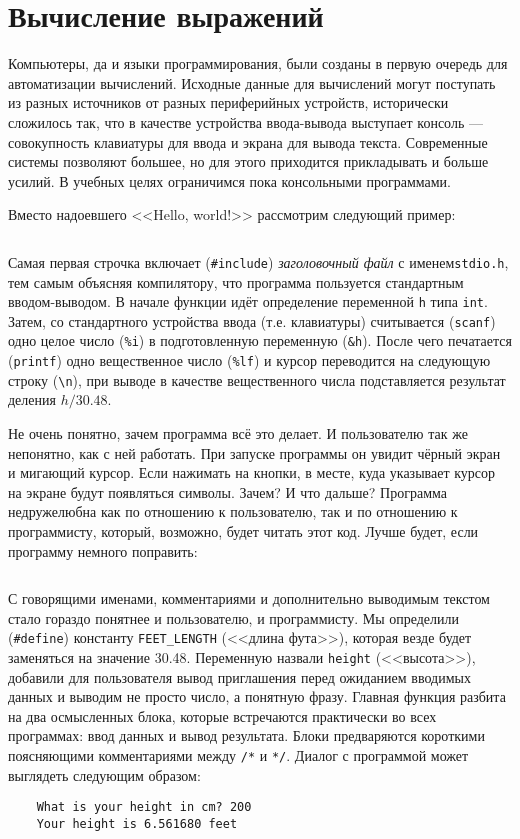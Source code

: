 \section{Вычисление выражений}

Компьютеры, да и языки программирования, были созданы в первую очередь для
автоматизации вычислений. Исходные данные для вычислений могут поступать из
разных источников от разных периферийных устройств, исторически сложилось так,
что в качестве устройства ввода-вывода выступает консоль --- совокупность
клавиатуры для ввода и экрана для вывода текста. Современные системы позволяют
большее, но для этого приходится прикладывать и больше усилий. В учебных целях
ограничимся пока консольными программами.

\zzneedspace
Вместо надоевшего <<Hello, world!>> рассмотрим следующий пример:
%
\inputminted{c}{samples/feet_bad.c}

Самая первая строчка включает (\verb|#include|) \textit{заголовочный файл} с
именем\linebreak \texttt{stdio.h}, тем самым объясняя компилятору, что программа
пользуется стандартным вводом-выводом. В начале функции идёт определение
переменной \texttt{h} типа \texttt{int}. Затем, со стандартного устройства
ввода (т.е. клавиатуры) считывается (\texttt{scanf}) одно целое число
(\texttt{\%i}) в подготовленную переменную (\verb|&h|). После чего печатается
(\texttt{printf}) одно вещественное число (\texttt{\%lf}) и курсор переводится
на следующую строку (\verb|\n|), при выводе в качестве вещественного числа
подставляется результат деления $h / 30.48$.

Не очень понятно, зачем программа всё это делает. И пользователю так же
непонятно, как с ней работать. При запуске программы он увидит чёрный экран и
мигающий курсор. Если нажимать на кнопки, в месте, куда указывает курсор на
экране будут появляться символы. Зачем? И что дальше? Программа недружелюбна
как по отношению к пользователю, так и по отношению к программисту, который,
возможно, будет читать этот код. Лучше будет, если программу немного
поправить:
%
\inputminted{c}{samples/feet.c}

С говорящими именами, комментариями и дополнительно выводимым текстом стало
гораздо понятнее и пользователю, и программисту. Мы определили
(\verb|#define|) константу \verb|FEET_LENGTH| (<<длина фута>>), которая везде
будет заменяться на значение 30.48. Переменную назвали \texttt{height}
(<<высота>>), добавили для пользователя вывод приглашения перед ожиданием
вводимых данных и выводим не просто число, а понятную фразу. Главная функция
разбита на два осмысленных блока, которые встречаются практически во всех
программах: ввод данных и вывод результата. Блоки предваряются короткими
поясняющими комментариями между \verb|/*| и \verb|*/|. Диалог с программой
может выглядеть следующим образом:
%
\begin{verbatim}
    What is your height in cm? 200
    Your height is 6.561680 feet
\end{verbatim}

